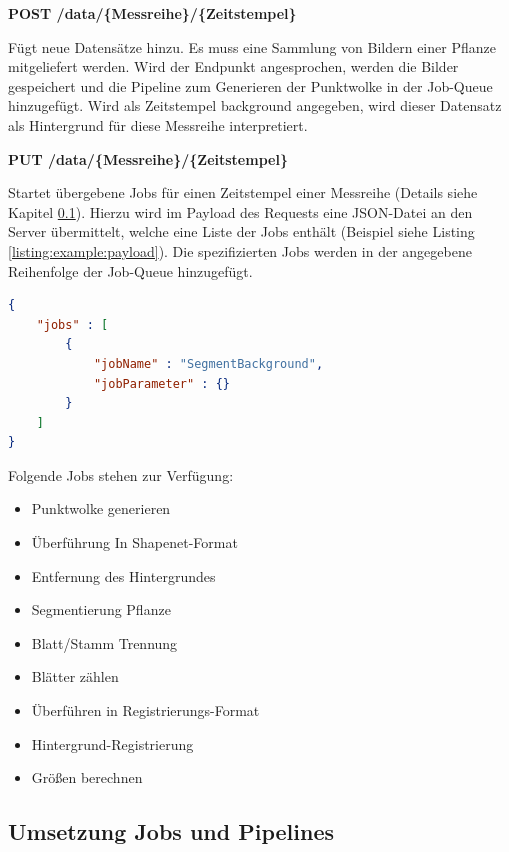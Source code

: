 \documentclass[12pt,titlepage, twoside]{article}
\begin{document}
\textbf{POST /data/\{Messreihe\}/\{Zeitstempel\}}

Fügt neue Datensätze hinzu. Es muss eine Sammlung von Bildern einer Pflanze mitgeliefert werden. 
Wird der Endpunkt angesprochen, werden die Bilder gespeichert und die Pipeline zum Generieren der Punktwolke in der Job-Queue hinzugefügt.
Wird als Zeitstempel \grqq{}background\grqq{} angegeben, wird dieser Datensatz als Hintergrund für diese Messreihe interpretiert.

\textbf{PUT /data/\{Messreihe\}/\{Zeitstempel\}}

Startet übergebene Jobs für einen Zeitstempel einer Messreihe (Details siehe Kapitel \ref{sec:realisierung:implementierung5}). 
Hierzu wird im Payload des Requests eine JSON-Datei an den Server übermittelt, welche eine Liste der Jobs enthält (Beispiel siehe Listing \ref{listing:example:payload}).
Die spezifizierten Jobs werden in der angegebene Reihenfolge der Job-Queue hinzugefügt.
\\

\begin{lstlisting}[language=json, caption={Beispiel Payload zum starten einer Pipeline}, captionpos=b, label=listing:example:payload]
{
    "jobs" : [
        {
            "jobName" : "SegmentBackground",
            "jobParameter" : {}
        }
    ]
}
\end{lstlisting}

Folgende Jobs stehen zur Verfügung:

\begin{itemize}
\item Punktwolke generieren
\item Überführung In Shapenet-Format 
\item Entfernung des Hintergrundes
\item Segmentierung Pflanze
\item Blatt/Stamm Trennung
\item Blätter zählen
\item Überführen in Registrierungs-Format 
\item Hintergrund-Registrierung
\item Größen berechnen
\end{itemize}


\subsection{Umsetzung Jobs und Pipelines}
\label{sec:realisierung:implementierung5}
\end{document}
